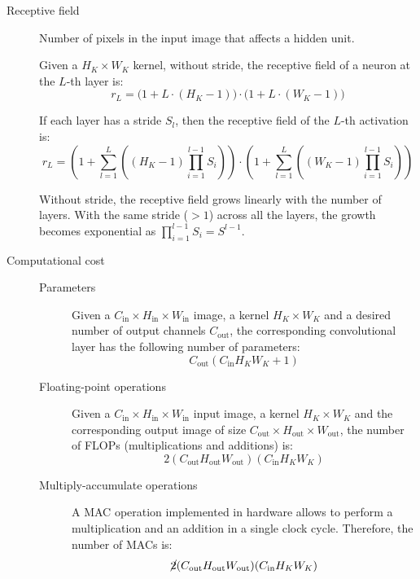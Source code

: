 \begin{description}
    
    \item[Receptive field] 
        Number of pixels in the input image that affects a hidden unit.

        Given a $H_K \times W_K$ kernel, without stride, the receptive field of a neuron at the $L$-th layer is:
        \[ r_L = \big( 1 + L \cdot (H_K - 1) \big) \cdot \big( 1 + L \cdot (W_K - 1) \big) \]

        If each layer has a stride $S_l$, then the receptive field of the $L$-th activation is:
        \[ 
            r_L = \left( 1 + \sum_{l=1}^{L} \left( (H_K - 1) \prod_{i=1}^{l-1}S_i \right) \right) \cdot 
                \left( 1 + \sum_{l=1}^{L} \left( (W_K - 1) \prod_{i=1}^{l-1}S_i \right) \right)
        \]

        \begin{remark}
            Without stride, the receptive field grows linearly with the number of layers.
            With the same stride ($> 1$) across all the layers, the growth becomes exponential as $\prod_{i=1}^{l-1}S_i = S^{l-1}$.
        \end{remark}

    \item[Computational cost] 
        \phantom{}
        \begin{description}
            \item[Parameters] 
                Given a $C_\text{in} \times H_\text{in} \times W_\text{in}$ image, a kernel $H_K \times W_K$ and a desired number of output channels $C_\text{out}$,
                the corresponding convolutional layer has the following number of parameters:
                \[ C_\text{out} ( C_\text{in} H_K W_K + 1 ) \]

            \item[Floating-point operations] 
                Given a $C_\text{in} \times H_\text{in} \times W_\text{in}$ input image, a kernel $H_K \times W_K$ and 
                the corresponding output image of size $C_\text{out} \times H_\text{out} \times W_\text{out}$,
                the number of FLOPs (multiplications and additions) is:
                \[ 2 (C_\text{out} H_\text{out} W_\text{out}) (C_\text{in} H_K W_K) \]

            \item[Multiply-accumulate operations] 
                A MAC operation implemented in hardware allows to perform a multiplication and an addition in a single clock cycle.
                Therefore, the number of MACs is:
                \[ \cancel{2} (C_\text{out} H_\text{out} W_\text{out}) (C_\text{in} H_K W_K) \]
        \end{description}
    

\end{description}
